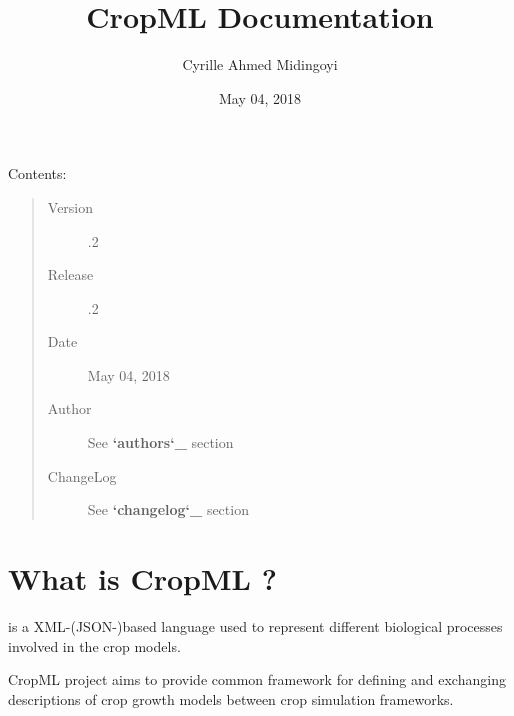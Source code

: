 \documentclass[letterpaper,13pt,english]{sphinxmanual}
\title{CropML Documentation}
\date{May 04, 2018}
\author{Cyrille Ahmed Midingoyi}
\begin{document}
\maketitle
\sphinxtableofcontents
{}\label{\detokenize{index::doc}}


Contents:

\begin{sphinxShadowBox}
\begin{quote}\begin{description}
\item[{Version}] .2

\item[{Release}] .2

\item[{Date}] \leavevmode
May 04, 2018

\item[{Author}] \leavevmode
See {\color{red}\bfseries{}{}`authors{}`\_} section

\item[{ChangeLog}] \leavevmode
See {\color{red}\bfseries{}{}`changelog{}`\_} section

\end{description}\end{quote}
\end{sphinxShadowBox}


\chapter{What is CropML ?}
\label{\detokenize{user/overview:what-is-cropml}}\label{\detokenize{user/overview:welcome-to-pycropml-documentation}}\label{\detokenize{user/overview::doc}}
\begin{DUlineblock}{0em}
\item[]  is a XML-(JSON-)based language used to represent different biological processes involved
in the crop models.
\item[] CropML project aims to provide common framework for defining and exchanging descriptions
of crop growth models between crop simulation frameworks.
\end{DUlineblock}
\end{document}
